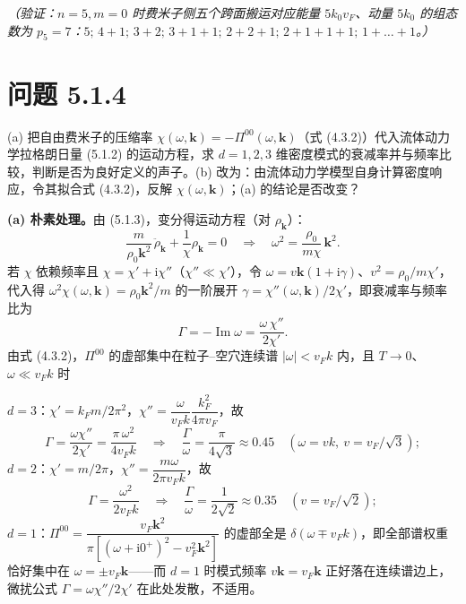 \emph{（验证：$n=5,m=0$ 时费米子侧五个跨面搬运对应能量 $5k_0v_F$、动量 $5k_0$ 的组态数为 $p_5=7$：$5;\,4{+}1;\,3{+}2;\,3{+}1{+}1;\,2{+}2{+}1;\,2{+}1{+}1{+}1;\,1{+}\dots{+}1$。）}

\section*{问题 5.1.4}
\begin{problem}
(a) 把自由费米子的压缩率 $\chi(\omega,\pmb{k})=-\Pi^{00}(\omega,\pmb{k})$（式 (4.3.2)）代入流体动力学拉格朗日量 (5.1.2) 的运动方程，求 $d=1,2,3$ 维密度模式的衰减率并与频率比较，判断是否为良好定义的声子。(b) 改为：由流体动力学模型自身计算密度响应，令其拟合式 (4.3.2)，反解 $\chi(\omega,\pmb{k})$；(a) 的结论是否改变？
\end{problem}
\solution

\textbf{(a) 朴素处理。}由 (5.1.3)，变分得运动方程（对 $\rho_{\pmb{k}}$）：
\begin{equation*}
\frac{m}{\rho_0\pmb{k}^{2}}\,\ddot{\rho}_{\pmb{k}}+\frac{1}{\chi}\rho_{\pmb{k}}=0
\quad\Longrightarrow\quad
\omega^{2}=\frac{\rho_0}{m\chi}\,\pmb{k}^{2}.
\end{equation*}
若 $\chi$ 依赖频率且 $\chi=\chi'+\mathrm{i}\chi''$（$\chi''\ll\chi'$），令 $\omega=v\pmb{k}(1+\mathrm{i}\gamma)$、$v^{2}=\rho_0/m\chi'$，代入得 $\omega^{2}\chi(\omega,\pmb{k})=\rho_0\pmb{k}^{2}/m$ 的一阶展开 $\gamma=\chi''(\omega,\pmb{k})/2\chi'$，即衰减率与频率比为
\begin{equation*}
\Gamma=-\operatorname{Im}\omega=\frac{\omega\,\chi''}{2\chi'} .
\end{equation*}
由式 (4.3.2)，$\Pi^{00}$ 的虚部集中在粒子--空穴连续谱 $|\omega|<v_Fk$ 内，且 $T\to0$、$\omega\ll v_Fk$ 时

$d=3$：$\chi'=k_Fm/2\pi^{2}$，$\chi''=\dfrac{\omega}{v_Fk}\dfrac{k_F^{2}}{4\pi v_F}$，故
\begin{equation*}
\Gamma=\frac{\omega\chi''}{2\chi'}=\frac{\pi\,\omega^{2}}{4v_Fk}
\quad\Longrightarrow\quad
\frac{\Gamma}{\omega}=\frac{\pi}{4\sqrt3}\approx0.45\quad(\omega=vk,\ v=v_F/\sqrt3);
\end{equation*}
$d=2$：$\chi'=m/2\pi$，$\chi''=\dfrac{m\omega}{2\pi v_Fk}$，故
\begin{equation*}
\Gamma=\frac{\omega^{2}}{2v_Fk}
\quad\Longrightarrow\quad
\frac{\Gamma}{\omega}=\frac{1}{2\sqrt2}\approx0.35\quad(v=v_F/\sqrt2);
\end{equation*}
$d=1$：$\Pi^{00}=\dfrac{v_F\pmb{k}^{2}}{\pi[(\omega+\mathrm{i}0^{+})^{2}-v_F^{2}\pmb{k}^{2}]}$ 的虚部全是 $\delta(\omega\mp v_Fk)$，即全部谱权重恰好集中在 $\omega=\pm v_F\pmb{k}$——而 $d=1$ 时模式频率 $v\pmb{k}=v_F\pmb{k}$ 正好落在连续谱边上，微扰公式 $\Gamma=\omega\chi''/2\chi'$ 在此处发散，不适用。

